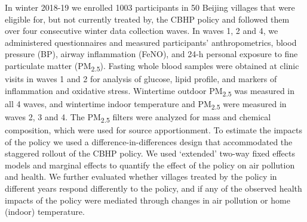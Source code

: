 \documentclass[
  letterpaper,
  DIV=11,
  numbers=noendperiod]{scrartcl}
\providecommand{\DIFaddtex}[1]{{\protect\color{blue}\uwave{#1}}} %
\providecommand{\DIFaddbegin}{} %
\providecommand{\DIFaddend}{} %
\providecommand{\DIFdelbegin}{} %
\providecommand{\DIFdelend}{} %
\providecommand{\DIFadd}[1]{\texorpdfstring{\DIFaddtex{#1}}{#1}} %
\newcommand{\DIFscaledelfig}{0.5}
\newlength{\DIFdelgraphicswidth} %
\newlength{\DIFdelgraphicsheight} %
\newcommand{\DIFaddincludegraphics}[2][]{{\color{blue}\fbox{\DIFOincludegraphics[#1]{#2}}}} %
\newcommand{\DIFdelincludegraphics}[2][]{%
\sbox{\DIFdelgraphicsbox}{\DIFOincludegraphics[#1]{#2}}%
\settoboxwidth{\DIFdelgraphicswidth}{\DIFdelgraphicsbox} %
\settoboxtotalheight{\DIFdelgraphicsheight}{\DIFdelgraphicsbox} %
\scalebox{\DIFscaledelfig}{%
\parbox[b]{\DIFdelgraphicswidth}{\usebox{\DIFdelgraphicsbox}\\[-\baselineskip] \rule{\DIFdelgraphicswidth}{0em}}\llap{\resizebox{\DIFdelgraphicswidth}{\DIFdelgraphicsheight}{%
\setlength{\unitlength}{\DIFdelgraphicswidth}%
\begin{picture}(1,1)%
\thicklines\linethickness{2pt} %
{\color[rgb]{1,0,0}\put(0,0){\framebox(1,1){}}}%
{\color[rgb]{1,0,0}\put(0,0){\line( 1,1){1}}}%
{\color[rgb]{1,0,0}\put(0,1){\line(1,-1){1}}}%
\end{picture}%
}\hspace*{3pt}}} %
} %
\DeclareRobustCommand{\DIFaddbegin}{\DIFOaddbegin \let\includegraphics\DIFaddincludegraphics} %
\DeclareRobustCommand{\DIFaddend}{\DIFOaddend \let\includegraphics\DIFOincludegraphics} %
\DeclareRobustCommand{\DIFdelbegin}{\DIFOdelbegin \let\includegraphics\DIFdelincludegraphics} %
\DeclareRobustCommand{\DIFdelend}{\DIFOaddend \let\includegraphics\DIFOincludegraphics} %
\begin{document}
In winter 2018-19 we enrolled 1003 participants in 50 Beijing villages
that were eligible for, but not currently treated by, the CBHP policy
and followed them over four consecutive winter data collection waves. In
waves 1, 2 and 4, we administered questionnaires and measured
participants' anthropometrics, blood pressure (BP), airway inflammation
(FeNO), and 24-h personal exposure to fine particulate matter
(PM\textsubscript{2.5}). Fasting whole blood samples were obtained at
clinic visits in waves 1 and 2 for analysis of glucose, lipid profile,
and markers of inflammation and oxidative stress. Wintertime outdoor
PM\textsubscript{2.5} was measured in all 4 waves, and wintertime indoor
temperature and PM\textsubscript{2.5} were measured in waves 2, 3 and 4.
The PM\textsubscript{2.5} filters were analyzed for mass and chemical
composition, which were used for source apportionment. To estimate the
impacts of the policy we used a difference-in-differences design that
accommodated the staggered rollout of the CBHP policy. We used
`extended' two-way fixed effects models and marginal effects to quantify
the effect of the policy on air pollution and health. We further
evaluated whether villages treated by the policy in different years
respond differently to the policy, and if any of the observed health
impacts of the policy were mediated through changes in air pollution or
home (indoor) temperature.

\DIFdelbegin %
\DIFdelend \DIFaddbegin \subsubsection*{\DIFadd{Results}}\label{results}
\DIFaddend 
\end{document}
